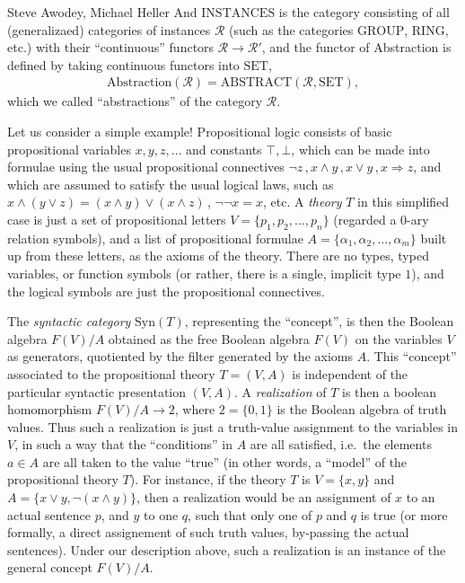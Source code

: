 \begin{artengenv2auth}{Steve Awodey, Michael Heller}
And $\mathrm{INSTANCES}$ is the category consisting of all (generalizaed) categories of instances $\mathcal{R}$ (such as the categories $\mathrm{GROUP}$, $\mathrm{RING}$, etc.) with their ``continuous'' functors  $\mathcal{R} \to \mathcal{R'}$, and the functor of Abstraction is defined by taking continuous functors into $\mathrm{SET}$, 
\begin{align*}
\mathrm{Abstraction}(\mathcal{R}) = \mathrm{ABSTRACT}(\mathcal{R}, \mathrm{SET}),
\end{align*}
which we called ``abstractions'' of the category $\mathcal{R}$. 

Let us consider a simple example!  Propositional logic consists of basic propositional variables $x, y, z, \dots$ and constants $\top, \bot$, which can be made into formulae using the usual propositional connectives $\neg z\,, x \wedge y\,, x\vee y\,, x\Rightarrow z$, and which are assumed to satisfy the usual logical laws, such as $x \wedge (y\vee z) = (x \wedge y)\vee (x \wedge z)$\,, $\neg\neg x = x$, etc.  A \emph{theory} $T$ in this simplified case is just a set of propositional letters $V = \{p_1, p_2, \dots, p_n\}$ (regarded a 0-ary relation symbols), and a list of propositional formulae $A = \{\alpha_1, \alpha_2, \dots, \alpha_m\}$ built up from these letters, as the axioms of the theory.  There are no types, typed variables, or function symbols (or rather, there is a single, implicit type $1$), and the logical symbols are just the propositional connectives.

The \emph{syntactic category} $\mathrm{Syn}(T)$, representing the ``concept'',  is then the Boolean algebra $F(V)/A$ obtained as the free Boolean algebra $F(V)$ on the variables $V$ as generators, quotiented by the filter generated by the axioms $A$.  This ``concept'' associated to the propositional theory $T = (V,A)$ is independent of the particular syntactic presentation $(V,A)$.  A \emph{realization} of $T$ is then a boolean homomorphism $F(V)/A \to 2$, where $2 = \{0,1\}$ is the Boolean algebra of truth values.  Thus such a realization is just a truth-value assignment to the variables in $V$, in such a way that the ``conditions'' in $A$ are all satisfied, i.e.\ the elements $a\in A$ are all taken to the value ``true'' (in other words, a ``model'' of the propositional theory $T$).  For instance, if the theory $T$ is $V= \{x, y\}$ and $A = \{x\vee y, \neg(x\wedge y)\}$, then a realization would be an assignment of $x$ to an actual sentence $p$, and $y$ to one $q$, such that only one of $p$ and $q$ is true (or more formally, a direct assignement of such truth values, by-passing the actual sentences).  Under our description above, such a realization is an instance of the general concept $F(V)/A$.


\end{artengenv2auth}
